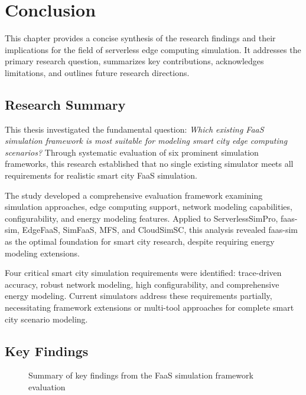 \chapter{Conclusion}

This chapter provides a concise synthesis of the research findings and their implications for the field of serverless edge computing simulation. It addresses the primary research question, summarizes key contributions, acknowledges limitations, and outlines future research directions.

\section{Research Summary}

This thesis investigated the fundamental question: \textit{Which existing FaaS simulation framework is most suitable for modeling smart city edge computing scenarios?} Through systematic evaluation of six prominent simulation frameworks, this research established that no single existing simulator meets all requirements for realistic smart city FaaS simulation.

The study developed a comprehensive evaluation framework examining simulation approaches, edge computing support, network modeling capabilities, configurability, and energy modeling features. Applied to ServerlessSimPro, faas-sim, EdgeFaaS, SimFaaS, MFS, and CloudSimSC, this analysis revealed faas-sim as the optimal foundation for smart city research, despite requiring energy modeling extensions.

Four critical smart city simulation requirements were identified: trace-driven accuracy, robust network modeling, high configurability, and comprehensive energy modeling. Current simulators address these requirements partially, necessitating framework extensions or multi-tool approaches for complete smart city scenario modeling.

\section{Key Findings}

\begin{figure}[htbp]
\centering
{}
\caption{Summary of key findings from the FaaS simulation framework evaluation}
\label{fig:key-findings}
\end{figure}


